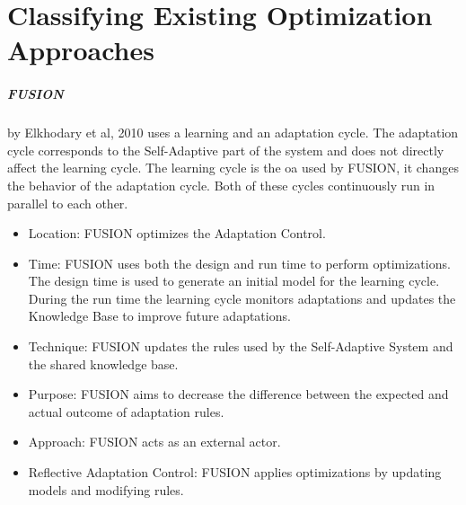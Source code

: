 \section{Classifying Existing Optimization Approaches}
\label{ch:Existing}


\subparagraph*{FUSION}
by Elkhodary et al, 2010 \cite*{FUSION}  uses a learning and an adaptation cycle.
The adaptation cycle corresponds to the Self-Adaptive part of the system
and does not directly affect the learning cycle.
The learning cycle is the \acrlong{oa} used by FUSION,
it changes the behavior of the adaptation cycle.
Both of these cycles continuously run in parallel to each other.
\begin{itemize}[nosep]
    \item Location: FUSION optimizes the Adaptation Control.
    \item Time: FUSION uses both the design and run time to perform optimizations.
    The design time is used to generate an initial model for the learning cycle.
    During the run time the learning cycle monitors adaptations
    and updates the Knowledge Base to improve future adaptations.
    \item Technique: FUSION updates the rules used by the Self-Adaptive System and the shared knowledge base.
    \item Purpose: FUSION aims to decrease the difference between the expected and actual outcome of adaptation rules.
    \item Approach: FUSION acts as an external actor.
    \item Reflective Adaptation Control: FUSION applies optimizations by updating models and modifying rules.
\end{itemize}

